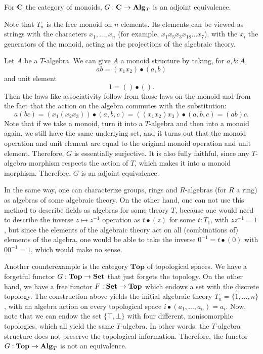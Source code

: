 \begin{example}\label{ex:free-monoid-theory}
  For $ \mathbf{C} $ the category of monoids, $ G: \mathbf{C} \to \mathbf{Alg}_{T} $ is an adjoint equivalence.

  Note that $ T_n $ is the free monoid on $ n $ elements. Its elements can be viewed as strings with the characters $ x_1, \dots, x_n $ (for example, $ x_1 x_5 x_3 x_{18} \dots x_7 $), with the $ x_i $ the generators of the monoid, acting as the projections of the algebraic theory.

  Let $ A $ be a $ T $-algebra. We can give $ A $ a monoid structure by taking, for $ a, b: A $,
  \[ a b = (x_1 x_2) \bullet (a, b) \]
  and unit element
  \[ 1 = () \bullet (). \]
  Then the laws like associativity follow from those laws on the monoid and from the fact that the action on the algebra commutes with the substitution:
  \[ a (b c) = (x_1 (x_2 x_3)) \bullet (a, b, c) = ((x_1 x_2) x_3) \bullet (a, b, c) = (a b) c. \]
  Note that if we take a monoid, turn it into a $ T $-algebra and then into a monoid again, we still have the same underlying set, and it turns out that the monoid operation and unit element are equal to the original monoid operation and unit element. Therefore, $ G $ is essentially surjective. It is also fully faithful, since any $ T $-algebra morphism respects the action of $ T $, which makes it into a monoid morphism. Therefore, $ G $ is an adjoint equivalence.
\end{example}

\begin{remark}
  In the same way, one can characterize groups, rings and $ R $-algebras (for $ R $ a ring) as algebras of some algebraic theory. On the other hand, one can not use this method to describe fields as algebras for some theory $ T $, because one would need to describe the inverse $ z \mapsto z^{-1} $ operation as $ t \bullet (z) $ for some $ t: T_1 $, with $ z z^{-1} = 1 $, but since the elements of the algebraic theory act on all (combinations of) elements of the algebra, one would be able to take the inverse $ 0^{-1} = t \bullet (0) $ with $ 0 0^{-1} = 1 $, which would make no sense.
\end{remark}

\begin{remark}
  Another counterexample is the category $ \mathbf{Top} $ of topological spaces. We have a forgetful functor $ G: \mathbf{Top} \to \mathbf{Set} $ that just forgets the topology. On the other hand, we have a free functor $ F: \mathbf{Set} \to \mathbf{Top} $ which endows a set with the discrete topology. The construction above yields the initial algebraic theory $ T_n = \{ 1, \dots, n \} $, with an algebra action on every topological space $ i \bullet (a_1, \dots, a_n) = a_i $. Now, note that we can endow the set $ \{ \top, \bot \} $ with four different, nonisomorphic topologies, which all yield the same $ T $-algebra. In other words: the $ T $-algebra structure does not preserve the topological information. Therefore, the functor $ G: \mathbf{Top} \to \mathbf{Alg}_{T} $ is not an equivalence.
\end{remark}

